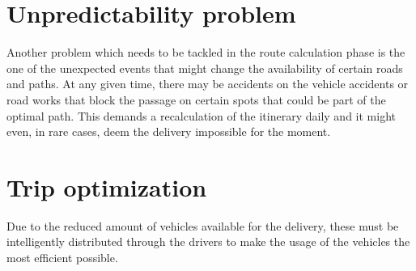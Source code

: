 \section{Unpredictability problem}
Another problem which needs to be tackled in the route calculation phase is the one of the unexpected events that might change the availability of certain roads and paths. At any given time, there may be accidents on the vehicle accidents or road works that block the passage on certain spots that could be part of the optimal path. This demands a recalculation of the itinerary daily and it might even, in rare cases, deem the delivery impossible for the moment.


\section{Trip optimization}
Due to the reduced amount of vehicles available for the delivery, these must be intelligently distributed through the drivers to make the usage of the vehicles the most efficient possible.